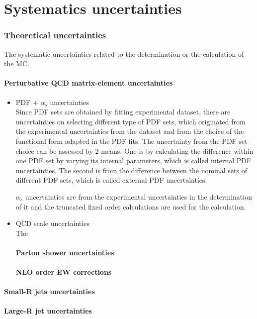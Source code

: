 \chapter{Systematics uncertainties}


\subsection{Theoretical uncertainties}
The systematic uncertainties related to the determination or the calculation of the MC.
\subsubsection{Perturbative QCD matrix-element uncertainties}
\begin{itemize}
      \item PDF + $\alpha_s$ uncertainties\\
      Since PDF sets are obtained by fitting experimental dataset, there are uncertainties on selecting different type of PDF sets, which originated from the experimental uncertainties from the dataset and from the choice of the functional form adapted in the PDF fits.
      The uncertainty from the PDF set choice can be assessed by 2 means. One is by calculating the difference within one PDF set by varying its internal parameters, which is called internal PDF uncertainties. The second is from the difference between the nominal sets of different PDF sets, which is called external PDF uncertainties.
      
      $\alpha_s$ uncertainties are from the experimental uncertainties in the determination of it and the truncated fixed order calculations are used for the calculation.
      
      
      \item QCD scale uncertainties\\
      The 
\subsubsection{Parton shower uncertainties}
\subsubsection{NLO order EW corrections}
\end{itemize}
\subsubsection{Small-R jets uncertainties}
\subsubsection{Large-R jet uncertainties}
